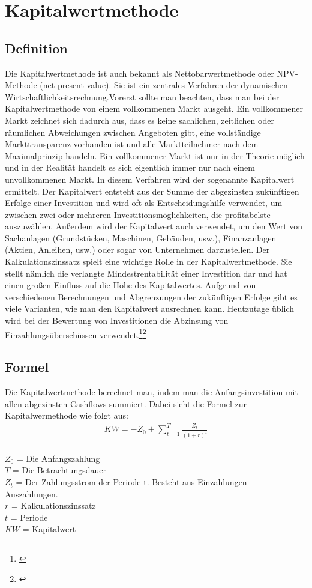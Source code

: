 \chapter{Kapitalwertmethode}
\label{Kapitalwertmethode}

\section{Definition}
Die Kapitalwertmethode ist auch bekannt als Nettobarwertmethode oder NPV-Methode (net present value).
Sie ist ein zentrales Verfahren der dynamischen Wirtschaftlichkeitsrechnung.Vorerst sollte man beachten, dass man bei der Kapitalwertmethode von einem vollkommenen Markt ausgeht. Ein vollkommener Markt zeichnet sich dadurch aus, dass es keine sachlichen, zeitlichen oder räumlichen Abweichungen zwischen Angeboten gibt, eine vollständige Markttransparenz vorhanden ist und alle Marktteilnehmer nach dem Maximalprinzip handeln. Ein vollkommener Markt ist nur in der Theorie möglich und in der Realität handelt es sich eigentlich immer nur nach einem unvollkommenen Markt. In diesem Verfahren wird der sogenannte Kapitalwert ermittelt. Der Kapitalwert entsteht aus der Summe der abgezinsten zukünftigen Erfolge einer Investition und wird oft als Entscheidungshilfe verwendet, um zwischen zwei oder mehreren Investitionsmöglichkeiten, die profitabelste auszuwählen. Außerdem wird der Kapitalwert auch verwendet, um den Wert von Sachanlagen (Grundstücken, Maschinen, Gebäuden, usw.), Finanzanlagen (Aktien, Anleihen, usw.) oder sogar von Unternehmen darzustellen.
Der Kalkulationszinssatz spielt eine wichtige Rolle in der Kapitalwertmethode. Sie stellt nämlich die verlangte Mindestrentabilität einer Investition dar und hat einen großen Einfluss auf die Höhe des Kapitalwertes.
Aufgrund von verschiedenen Berechnungen und Abgrenzungen der zukünftigen Erfolge gibt es viele Varianten, wie man den Kapitalwert ausrechnen kann. Heutzutage üblich wird bei der Bewertung von Investitionen die Abzinsung von Einzahlungsüberschüssen verwendet.\footnote{\cite{wikipedia-kapitalwertmethode}}\footnote{\cite{weltsparen-kapitalwertmethode}}
\newpage
\section{Formel}
Die Kapitalwertmethode berechnet man, indem man die Anfangsinvestition mit allen abgezinsten Cashflows summiert. Dabei sieht die Formel zur Kapitalwermethode wie folgt aus:
\begin{align*}
    KW = -Z_{0} + \sum \limits_{t=1}^{T}{\frac{Z_{t}}{(1+r)^{t}}}
\end{align*}
\\
$Z_0$ = Die Anfangszahlung \\
$T$  = Die Betrachtungsdauer\\
$Z_t$ = Der Zahlungsstrom der Periode t. Besteht aus Einzahlungen - Auszahlungen.\\
$r$ = Kalkulationszinssatz\\
$t$ = Periode\\
$KW$ = Kapitalwert
